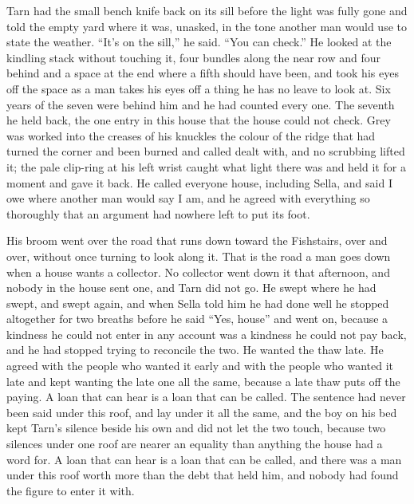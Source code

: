 Tarn had the small bench knife back on its sill before the light was fully gone and told the empty yard where it was, unasked, in the tone another man would use to state the weather. “It's on the sill,” he said. “You can check.” He looked at the kindling stack without touching it, four bundles along the near row and four behind and a space at the end where a fifth should have been, and took his eyes off the space as a man takes his eyes off a thing he has no leave to look at. Six years of the seven were behind him and he had counted every one. The seventh he held back, the one entry in this house that the house could not check. Grey  was worked into the creases of his knuckles the colour of the ridge that had turned the corner and been burned and called dealt with, and no scrubbing lifted it; the pale clip-ring at his left wrist caught what light there was and held it for a moment and gave it back. He called everyone house, including Sella, and said I owe where another man would say I am, and he agreed with everything so thoroughly that an argument had nowhere left to put its foot.

His broom went over the road that runs down toward the Fishstairs, over and over, without once turning to look along it. That is the road a man goes down when a house wants a collector. No collector went down it that afternoon, and nobody in the house sent one, and Tarn did not go. He swept where he had swept, and swept again, and when Sella told him he had done well he stopped altogether for two breaths before he said “Yes, house” and went on, because a kindness he could not enter in any account was a kindness he could not pay back, and he had stopped trying to reconcile the two. He wanted the thaw late. He agreed with the people who wanted it early and with the people who wanted it late and kept wanting the late one all the same, because a late thaw puts off the paying. A loan that can hear is a loan that can be called. The sentence had never been said under this roof, and lay under it all the same, and the boy on his bed kept Tarn's silence beside his own and did not let the two touch, because two silences under one roof are nearer an equality than anything the house had a word for. A loan that can hear is a loan that can be called, and there was a man under this roof worth more than the debt that held him, and nobody had found the figure to enter it with.

\scenebreak

